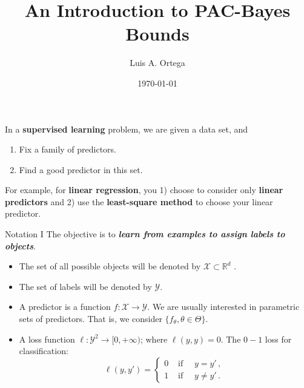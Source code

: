 \documentclass[aspectratio=159]{beamer}
\title{An Introduction to PAC-Bayes Bounds}
\date{\today}
\author{Luis A. Ortega}
\institute{Universidad Autónoma de Madrid}
\begin{document}
    \maketitle


    \begin{frame}{}
        In a \textbf{supervised learning} problem, we are given a data set, and 
        \begin{enumerate}
            \item Fix a family of predictors.
            \item Find a good predictor in this set.
        \end{enumerate}
        \pause
        For example, for \textbf{linear regression}, you 1) choose to consider only \textbf{linear predictors} and 2) use the \textbf{least-square method} to choose your linear predictor.
    \end{frame}

    \begin{frame}{Notation I}
        The objective is to \textit{\textbf{learn from examples to assign labels to objects}}. %
        \begin{itemize}[<+->]
            \item The set of all possible objects will be denoted by \(\mathcal{X} \subset \mathbb{R}^d\) . 
            \item The set of labels will be denoted by \(\mathcal{Y}\).
            \item A predictor is a function \(f : \mathcal{X} \to \mathcal{Y}\). We are usually interested in parametric sets of predictors. That is, we consider \(\{f_{\theta}, \theta \in \Theta\}\).
            \item A loss function \(\ell : \mathcal{Y}^2 \to [0, + \infty)\); where \(\ell(y, y) = 0 \).
            The \(0-1\) loss for classification:
            \[
                \ell(y, y') = \begin{cases}
                    0 & \text{ if } \quad y = y'\,,\\
                    1 & \text{ if } \quad y \neq y'\,.
                \end{cases}
            \]
        \end{itemize}
    \end{frame}
\end{document}
